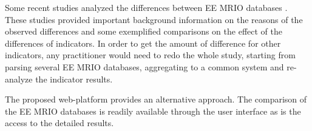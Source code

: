 Some recent studies analyzed the differences between EE MRIO databases \cite{Stadler_2014, Owen_2014, Moran_2014}. These studies provided important background information on the reasons of the observed differences and some exemplified comparisons on the effect of the differences of indicators. In order to get the amount of difference for other indicators, any practitioner would need to redo the whole study, starting from parsing several EE MRIO databases, aggregating to a common system and re-analyze the indicator results. 

The proposed web-platform provides an alternative approach. The comparison of the EE MRIO databases is readily available through the user interface as is the access to the detailed results.